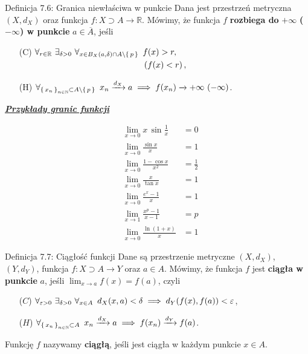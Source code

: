 \documentclass{article}
\newcommand{\hquad}{\mkern9mu}
\newcommand{\R}{\mathbb{R}}
\newcommand{\N}{\mathbb{N}}
\newcommand{\arr}[1]{\xrightarrow{#1}}
\newcommand*\closure[1]{\overline{#1}}
\newcommand{\seq}[1]{\set{#1_n}_{n\in\N}}
\begin{document}
\begin{defr}{Definicja 7.6: Granica niewłaściwa w punkcie}
Dana jest przestrzeń metryczna $(X,d_X)$ oraz funkcja $f:X\supset A\to\R$. Mówimy, że funkcja $f$ \textbf{rozbiega do}
$\boldsymbol{+\infty}$ \textbf{($\boldsymbol{-\infty}$) w punkcie} $a\in\closure{A}$, jeśli
    \begin{enumerate}
        \item[(C)] $\begin{aligned}[t]
        \forall_{r\in\R}\ \exists_{\delta>0}\ \forall_{x\in B_X(a, \delta)\cap A\setminus\set{p}}\hquad &f(x)>r,\\
        &\left(f(x)<r\right),
        \end{aligned}$
        \item[(H)] $\forall_{\seq{x}\subset A\setminus\set{p}}\hquad x_n\arr{d_X}a\implies f(x_n)\arr{}+\infty\ (-\infty)$.
    \end{enumerate}
\end{defr}

\bigskip

\textit{\textbf{\underline{Przykłady granic funkcji}}}

\begin{align}
    &\lim_{x\to 0}{x\,\sin{\frac{1}{x}}}&=0\\
    &\lim_{x\to 0}{\frac{\sin{x}}{x}}&=1\\
    &\lim_{x\to 0}{\frac{1-\cos{x}}{x^2}}&=\frac{1}{2}\\
    &\lim_{x\to 0}{\frac{x}{\tan{x}}}&=1\\
    &\lim_{x\to 0}{\frac{e^x-1}{x}}&=1\\
    &\lim_{x\to 1}{\frac{x^p-1}{x-1}}&=p\\
    &\lim_{x\to 0}{\frac{\ln{(1+x)}}{x}}&=1
\end{align}

\bigskip

\begin{defr}{Definicja 7.7: Ciągłość funkcji}
    Dane są przestrzenie metryczne $(X,d_X)$, $(Y, d_Y)$, funkcja $f:X\supset A\to Y$ oraz $a\in A$. Mówimy, że
    funkcja $f$ jest \textbf{ciągła w punkcie} $a$, jeśli $\lim_{x\to a}{f(x)}=f(a)$, czyli
    \begin{enumerate}
        \item[($C$)] $\forall_{\varepsilon>0}\ \exists_{\delta>0}\ \forall_{x\in A}\hquad d_X(x, a)<\delta\implies d_Y(f(x), f(a))<\varepsilon$,
        \item[($H$)] $\forall_{\seq{x}\subset A}\hquad x_n\arr{d_X} a\implies f(x_n)\arr{d_Y}f(a)$.  
    \end{enumerate}
    Funkcję $f$ nazywamy \textbf{ciągłą}, jeśli jest ciągła w każdym punkcie $x\in A$.
\end{defr}
\end{document}
